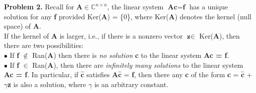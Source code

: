 \documentclass[14pt,a4paper]{article}
\begin{document}
\large\textbf{Problem 2.} Recall for $\textbf{A} \in \mathbb{C}^{n \times n}$, the linear system $\textbf{A}\textbf{c} = \textbf{f}$ has a unique solution for any \textbf{f} provided Ker(\textbf{A}) = \{0\}, where Ker(\textbf{A}) denotes the kernel (null space) of \textbf{A}. \\
If the kernel of \textbf{A} is larger, i.e., if there is a nonzero vector $\textbf{z} \in $ Ker(\textbf{A}), then there are two possibilities: \\
	$\bullet$ If \textbf{f} $\notin$ Ran(\textbf{A}) then there is \textit{no solution} \textbf{c} to the linear system \textbf{Ac = f}. \\
	$\bullet$ If \textbf{f} $\in$ Ran(\textbf{A}), then there are \textit{infinitely many solutions} to the linear system \textbf{Ac = f}. In particular, if $\hat{\textbf{c}}$ satisfies \textbf{A}$\hat{\textbf{c}}$ = \textbf{f}, then there any \textbf{c} of the form \textbf{c} =  $\hat{\textbf{c}}$ + $\gamma$\textbf{z} is also a solution, where $\gamma$ is an arbitrary constant. 
	
\end{document}
